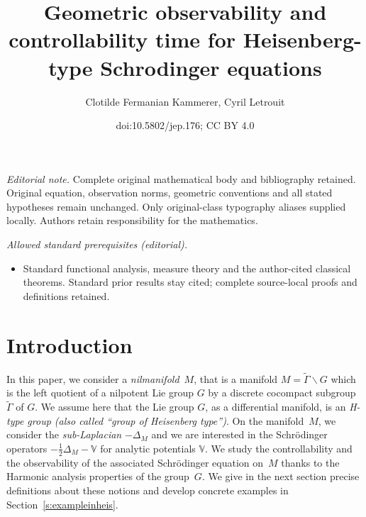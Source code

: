 \documentclass[10pt]{amsart}
\title{Geometric observability and controllability time for Heisenberg-type Schrodinger equations}
\author{Clotilde Fermanian Kammerer, Cyril Letrouit}
\date{doi:10.5802/jep.176; CC BY 4.0}
\theoremstyle{plain}
\theoremstyle{definition}
\def\bbV{{\mathbb V}}
\providecommand{\mainmatter}{}\providecommand{\backmatter}{}
\begin{document}
\maketitle
\noindent\textit{Editorial note.} Complete original mathematical body and bibliography retained. Original equation, observation norms, geometric conventions and all stated hypotheses remain unchanged. Only original-class typography aliases supplied locally. Authors retain responsibility for the mathematics.\par\medskip
\noindent\textit{Allowed standard prerequisites (editorial).}\begin{itemize}
\item Standard functional analysis, measure theory and the author-cited classical theorems. Standard prior results stay cited; complete source-local proofs and definitions retained.
\end{itemize}\medskip
\vspace*{-\baselineskip}
\tableofcontents
\mainmatter

\section{Introduction} \label{s:intro}

In this paper, we consider a \emph{nilmanifold}~$M$, that is a
manifold $M=\widetilde{\Gamma}\backslash G$ which is the left quotient of a nilpotent Lie group $G$ by a discrete cocompact subgroup $\widetilde{\Gamma}$ of $G$. We assume here that the Lie group $G$, as a differential manifold, is an \emph{H-type group (also called ``group of Heisenberg type'')}. On the manifold~$M$, we consider the \emph{sub-Laplacian} $-\Delta_M$ and we are interested in the Schrödinger operators $-\frac12\Delta_M-\bbV$ for analytic potentials $\bbV$. We study the controllability and the observability of the associated Schrödinger equation on~$M$ thanks to the Harmonic analysis properties of the group~$G$.
We give in the next section precise definitions about these notions and develop concrete
examples in Section~\ref{s:exampleinheis}.
\end{document}
